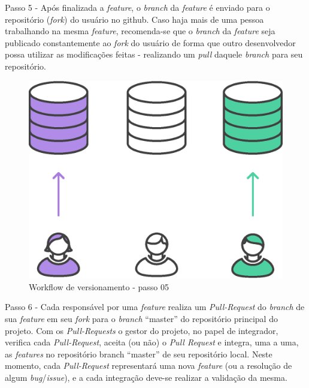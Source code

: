 Passo 5 - Após finalizada a \textit{feature}, o \textit{branch} da \textit{feature} é enviado para o repositório (\textit{fork}) do usuário no github. Caso haja mais de uma pessoa trabalhando na mesma \textit{feature}, recomenda-se que o \textit{branch} da \textit{feature} seja publicado constantemente ao \textit{fork} do usuário de forma que outro desenvolvedor possa utilizar as modificações feitas - realizando um \textit{pull} daquele \textit{branch} para seu repositório.
    \begin{figure}[htb]%
        \begin{center}
            \includegraphics[scale=0.2]{./imagens/forkflow5.eps}%
        \end{center}%
        \caption{Workflow de versionamento - passo 05 \label{fig:forkflow05}}%
    \end{figure}%
\newpage
Passo 6 - Cada responsável por uma \textit{feature} realiza um \textit{Pull-Request} do \textit{branch} de sua \textit{feature} em seu \textit{fork} para o \textit{branch} ``master'' do repositório principal do projeto. Com os \textit{Pull-Requests} o gestor do projeto, no papel de integrador, verifica cada \textit{Pull-Request}, aceita (ou não) o \textit{Pull Request} e integra, uma a uma, as \textit{features} no repositório branch ``master'' de seu repositório local. Neste momento, cada \textit{Pull-Request} representará uma nova \textit{feature} (ou a resolução de algum \textit{bug}/\textit{issue}), e a cada integração deve-se realizar a validação da mesma.
